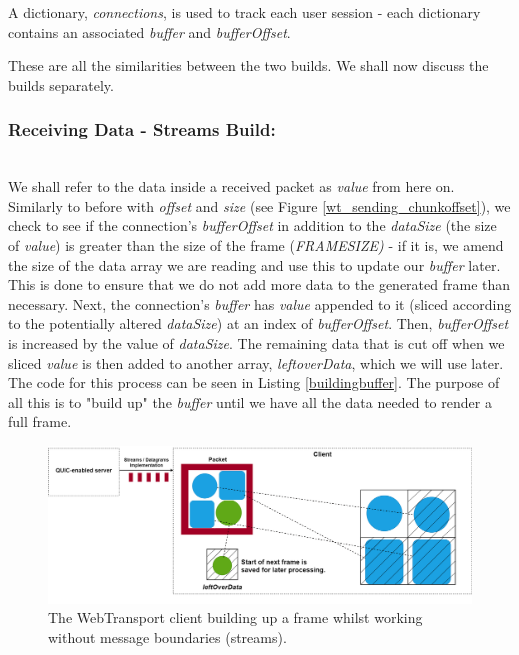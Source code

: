 A dictionary, \textit{connections}, is used to track each user session - each dictionary contains an associated \textit{buffer} and \textit{bufferOffset}. 

These are all the similarities between the two builds. We shall now discuss the builds separately.
\hfill\\
\subsubsection{Receiving Data - Streams Build:}
\hfill\\
We shall refer to the data inside a received packet as \textit{value} from here on. Similarly to before with \textit{offset} and \textit{size} (see Figure \ref{wt_sending_chunkoffset}), we check to see if the connection's \textit{bufferOffset} in addition to the \textit{dataSize} (the size of \textit{value}) is greater than the size of the frame (\textit{FRAMESIZE)} - if it is, we amend the size of the data array we are reading and use this to update our \textit{buffer} later. This is done to ensure that we do not add more data to the generated frame than necessary. Next, the connection's \textit{buffer} has \textit{value} appended to it (sliced according to the potentially altered \textit{dataSize}) at an index of \textit{bufferOffset}. Then, \textit{bufferOffset} is increased by the value of \textit{dataSize}. The remaining data that is cut off when we sliced \textit{value} is then added to another array, \textit{leftoverData}, which we will use later. The code for this process can be seen in Listing \ref{buildingbuffer}. The purpose of all this is to "build up" the \textit{buffer} until we have all the data needed to render a full frame.

\begin{figure}[h]
    \centering
    \includegraphics[width=1\linewidth]{images/wt_streams_leftoverdata.png}
	\caption{The WebTransport client building up a frame whilst working without message boundaries (streams).}
    \label{wt_streams_leftoverdata}
\end{figure}


